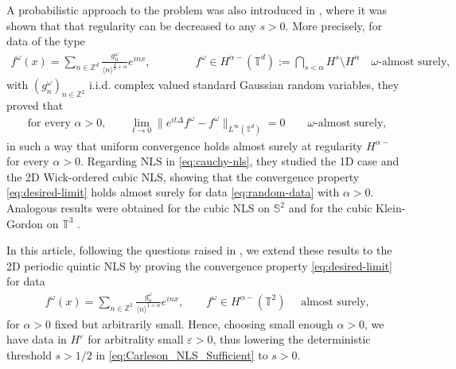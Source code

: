 \documentclass[11pt, xcolor = dvipsnames,reqno
]{amsart}
\theoremstyle{definition}
\theoremstyle{remark}
\begin{document}
    A probabilistic approach to the problem was also introduced in \cite{CLS2020}, where it was shown that that regularity can be decreased to any $s > 0$. 
    More precisely, for data of the type
    \begin{align}\label{eq:random-data}
        f^{\omega}(x) = \sum_{n \in \mathbb{Z}^d} \frac{g_n^{\omega}}{\langle n \rangle^{\frac{d}{2} + \alpha}} e^{inx}, 
        \qquad \qquad 
        f^\omega \in H^{\alpha -}(\mathbb T^d) := \bigcap_{s < \alpha} H^s \setminus H^\alpha \quad \omega\text{-almost surely},
    \end{align}
    with $(g_n^{\omega})_{n \in \mathbb{Z}^2}$ i.i.d. complex valued standard Gaussian random variables,
    they proved that 
	\begin{align}\label{eq:Linear_Convergence_Probabilistic}
		\text{ for every } \alpha > 0, 
        \qquad \lim_{t \to 0} \lVert  e^{i t \Delta}f^{\omega} - f^{\omega} \rVert_{L^\infty(\mathbb T^d)} 
        =0
        \qquad \omega\text{-almost surely, }
	\end{align}
    in such a way that uniform convergence holds almost surely at regularity $H^{\alpha-}$ for every $\alpha > 0$. 
    Regarding NLS in \eqref{eq:cauchy-nls}, they studied the 1D case and the 2D Wick-ordered cubic NLS, showing that the convergence property \eqref{eq:desired-limit} holds almost surely for data \eqref{eq:random-data} with $\alpha > 0$.  
    Analogous results were obtained for the cubic NLS on $\mathbb S^2$ \cite{MSSZZ2026}
    and for the cubic Klein-Gordon on $\mathbb T^3$ \cite{LucaMerino2026}.

    In this article, following the questions raised in \cite{CLS2020}, we extend these results to the 2D periodic quintic NLS by proving the convergence property \eqref{eq:desired-limit} for data
    \begin{align}\label{eq:random-data_2D}
        f^{\omega}(x) = \sum_{n \in \mathbb{Z}^2} \frac{g_n^{\omega}}{\langle n \rangle^{1 + \alpha}} e^{inx}, 
        \qquad 
        f^\omega 
        \in H^{\alpha -}(\mathbb T^2) 
        \quad \text{ almost surely,}
    \end{align}
    for $\alpha > 0$ fixed but arbitrarily small.
    Hence, choosing small enough $\alpha > 0$, we have data in $H^\varepsilon$ for arbitrality small $\varepsilon > 0$, 
    thus lowering the deterministic threshold $s>1/2$ in \eqref{eq:Carleson_NLS_Sufficient} to $s > 0$. 
    
\end{document}
